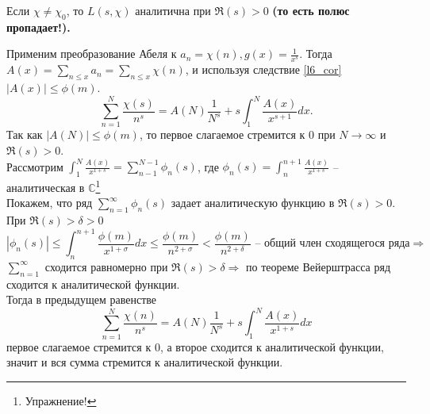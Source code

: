 \begin{lemma} \label{l7_lm6}
	Если $\chi \ne \chi_0$, то $L(s, \chi)$ аналитична при $\Re(s) > 0$ \bf (то есть полюс пропадает!).
\end{lemma}
\begin{pf}
	Применим преобразование Абеля к $\displaystyle a_n = \chi(n), g(x) = \frac{1}{x^s}$. Тогда $\displaystyle A(x) = \sum_{n \leq x} a_n = \sum_{n \leq x} \chi(n)$, и используя следствие \ref{l6_cor} $|A(x)| \leq \phi(m)$.
	$$\sum_{n = 1}^{N} \frac{\chi(s)}{n^s} = A(N) \frac{1}{N^s} + s \int_{1}^{N} \frac{A(x)}{x^{s + 1}} dx.$$
	Так как $|A(N)| \leq \phi(m)$, то первое слагаемое стремится к $0$ при $N \rightarrow \infty$ и $\Re(s) > 0$.\\
	Рассмотрим $\displaystyle \int_1^N \frac{A(x)}{x^{1 + s}} = \sum_{n - 1}^{N - 1} \phi_n(s)$, где $\displaystyle \phi_n(s) = \int_{n}^{n + 1} \frac{A(x)}{x^{1 + s}}$ -- аналитическая в $\mathbb{C}$\footnote{Упражнение!}\\
	Покажем, что ряд $\displaystyle \sum_{n = 1}^{\infty} \phi_n(s)$ задает аналитическую функцию в $\Re(s) > 0$. При $\Re(s) > \delta > 0$
	$$|\phi_n(s)| \leq \int_n^{n + 1} \frac{\phi(m)}{x^{1 + \sigma}} dx \leq  \frac{\phi(m)}{n^{2 + \sigma}} < \frac{\phi(m)}{n^{2 + \delta}} \text{ --  общий член сходящегося ряда} \Rightarrow$$
	$\displaystyle \sum_{n = 1}^{\infty}$ сходится равномерно при $\Re(s) > \delta \Rightarrow$ по теореме Вейерштрасса ряд сходится к аналитической функции.\\
	Тогда в предыдущем равенстве 
	$$\sum_{n = 1}^{N} \frac{\chi(n)}{n^s} = A(N) \frac{1}{N^s} + s \int_{1}^{N} \frac{A(x)}{x^{1 + s}} dx$$
	первое слагаемое стремится к 0, а второе сходится к аналитической функции, значит и вся сумма стремится к аналитической функции.
\end{pf}

